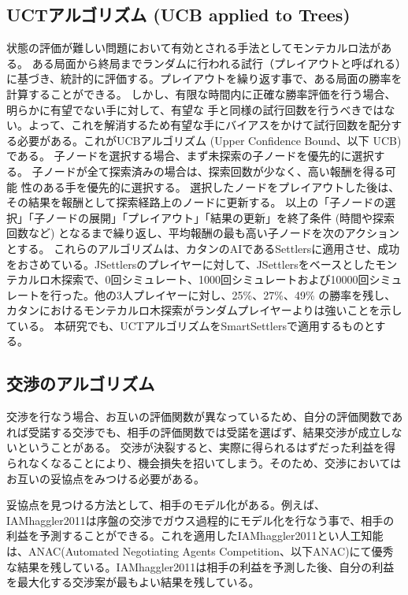 \documentclass[a4, 10pt,dvipdfmx,twocolumn]{jsarticle}
\begin{document}
\subsection{UCTアルゴリズム (UCB applied to Trees)}
状態の評価が難しい問題において有効とされる手法としてモンテカルロ法がある。
ある局面から終局までランダムに行われる試行（プレイアウトと呼ばれる）に基づき、統計的に評価する。プレイアウトを繰り返す事で、ある局面の勝率を計算することができる。
しかし、有限な時間内に正確な勝率評価を行う場合、明らかに有望でない手に対して、有望な 手と同様の試行回数を行うべきではない。よって、これを解消するため有望な手にバイアスをかけて試行回数を配分する必要がある。これがUCBアルゴリズム (Upper Confidence Bound、以下 UCB) である\cite{kocsis2006bandit}。
子ノードを選択する場合、まず未探索の子ノードを優先的に選択する。
子ノードが全て探索済みの場合は、探索回数が少なく、高い報酬を得る可能
性のある手を優先的に選択する。
選択したノードをプレイアウトした後は、その結果を報酬として探索経路上のノードに更新する。
以上の「子ノードの選択」「子ノードの展開」「プレイアウト」「結果の更新」を終了条件 (時間や探索回数など) となるまで繰り返し、平均報酬の最も高い子ノードを次のアクションとする。
これらのアルゴリズムは、カタンのAIであるSettlersに適用させ、成功をおさめている\cite{szita2010monte}。JSettlersのプレイヤーに対して、JSettlersをベースとしたモンテカルロ木探索で、0回シミュレート、1000回シミュレートおよび10000回シミュレートを行った。他の3人プレイヤーに対し、25\%、27\%、49\% の勝率を残し、カタンにおけるモンテカルロ木探索がランダムプレイヤーよりは強いことを示している。
本研究でも、UCTアルゴリズムをSmartSettlersで適用するものとする。

\subsection{交渉のアルゴリズム}
交渉を行なう場合、お互いの評価関数が異なっているため、自分の評価関数であれば受諾する交渉でも、相手の評価関数では受諾を選ばず、結果交渉が成立しないということがある。
交渉が決裂すると、実際に得られるはずだった利益を得られなくなることにより、機会損失を招いてしまう。そのため、交渉においてはお互いの妥協点をみつける必要がある。

妥協点を見つける方法として、相手のモデル化\cite{baarslag2012evaluating}がある。例えば、IAMhaggler2011は序盤の交渉でガウス過程的\cite{rasmussen2006gaussian}にモデル化を行なう事で、相手の利益を予測することができる。これを適用したIAMhaggler2011\cite{williams2013iamhaggler2011}とい人工知能は、ANAC(Automated Negotiating Agents Competition、以下ANAC)にて優秀な結果を残している。IAMhaggler2011は相手の利益を予測した後、自分の利益を最大化する交渉案が最もよい結果を残している。
\end{document}
